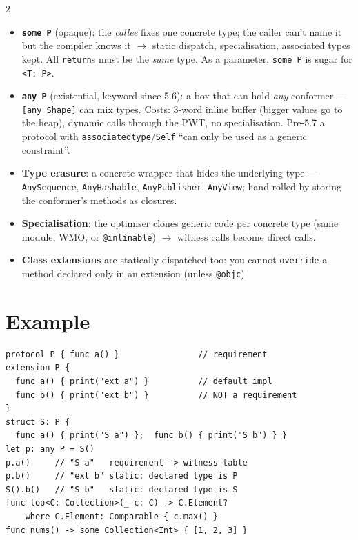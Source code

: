 \documentclass[8pt]{extarticle}
\begin{document}
\begin{multicols}{2}
\begin{itemize}
  \item \textbf{\texttt{some P}} (opaque): the \emph{callee} fixes one concrete type; the caller can't
        name it but the compiler knows it $\to$ static dispatch, specialisation, associated types
        kept. All \texttt{return}s must be the \emph{same} type. As a parameter, \texttt{some P}
        is sugar for \texttt{<T: P>}.
  \item \textbf{\texttt{any P}} (existential, keyword since 5.6): a box that can hold \emph{any}
        conformer — \texttt{[any Shape]} can mix types. Costs: 3-word inline buffer (bigger values go
        to the heap), dynamic calls through the PWT, no specialisation. Pre-5.7 a protocol with
        \texttt{associatedtype}/\texttt{Self} ``can only be used as a generic constraint''.
  \item \textbf{Type erasure}: a concrete wrapper that hides the underlying type —
        \texttt{AnySequence}, \texttt{AnyHashable}, \texttt{AnyPublisher}, \texttt{AnyView}; hand-rolled
        by storing the conformer's methods as closures.
  \item \textbf{Specialisation}: the optimiser clones generic code per concrete type (same module,
        WMO, or \texttt{@inlinable}) $\to$ witness calls become direct calls.
  \item \textbf{Class extensions} are statically dispatched too: you cannot \texttt{override} a
        method declared only in an extension (unless \texttt{@objc}).
\end{itemize}

\section{Example}
\begin{lstlisting}[language=SwiftSheet]
protocol P { func a() }                // requirement
extension P {
  func a() { print("ext a") }          // default impl
  func b() { print("ext b") }          // NOT a requirement
}
struct S: P {
  func a() { print("S a") };  func b() { print("S b") } }
let p: any P = S()
p.a()     // "S a"   requirement -> witness table
p.b()     // "ext b" static: declared type is P
S().b()   // "S b"   static: declared type is S
func top<C: Collection>(_ c: C) -> C.Element?
    where C.Element: Comparable { c.max() }
func nums() -> some Collection<Int> { [1, 2, 3] }
\end{lstlisting}

\columnbreak


\end{multicols}
\end{document}
